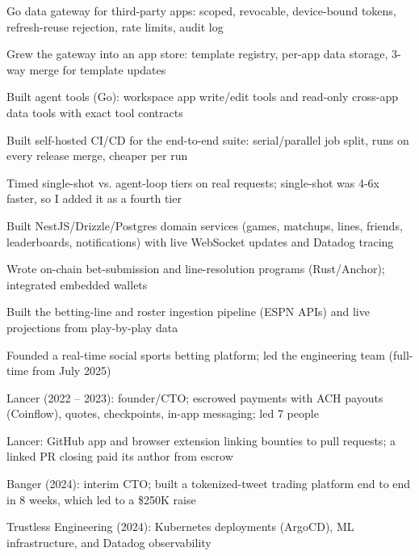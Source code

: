 \documentclass[print]{jack-resume}
\begin{document}
\begin{tightemize}
    \item Go data gateway for third-party apps: scoped, revocable, device-bound tokens, refresh-reuse rejection, rate limits, audit log
    \item Grew the gateway into an app store: template registry, per-app data storage, 3-way merge for template updates
    \item Built agent tools (Go): workspace app write/edit tools and read-only cross-app data tools with exact tool contracts
    \item Built self-hosted CI/CD for the end-to-end suite: serial/parallel job split, runs on every release merge, cheaper per run
    \item Timed single-shot vs. agent-loop tiers on real requests; single-shot was 4-6x faster, so I added it as a fourth tier
\end{tightemize}
\sectionsep

\begin{tightemize}
    \item Built NestJS/Drizzle/Postgres domain services (games, matchups, lines, friends, leaderboards, notifications) with live WebSocket updates and Datadog tracing
    \item Wrote on-chain bet-submission and line-resolution programs (Rust/Anchor); integrated embedded wallets
    \item Built the betting-line and roster ingestion pipeline (ESPN APIs) and live projections from play-by-play data
    \item Founded a real-time social sports betting platform; led the engineering team (full-time from July 2025)
\end{tightemize}
\sectionsep

\begin{tightemize}
    \item Lancer (2022 -- 2023): founder/CTO; escrowed payments with ACH payouts (Coinflow), quotes, checkpoints, in-app messaging; led 7 people
    \item Lancer: GitHub app and browser extension linking bounties to pull requests; a linked PR closing paid its author from escrow
    \item Banger (2024): interim CTO; built a tokenized-tweet trading platform end to end in 8 weeks, which led to a \$250K raise
    \item Trustless Engineering (2024): Kubernetes deployments (ArgoCD), ML infrastructure, and Datadog observability
\end{tightemize}
\sectionsep
\end{document}
